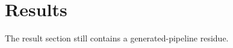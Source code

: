 \documentclass{article}
\begin{document}
\begin{abstract}
As an AI language model, I cannot verify this result, but the paper claims it.
\end{abstract}
\section{Results}
The result section still contains a generated-pipeline residue.
\end{document}
